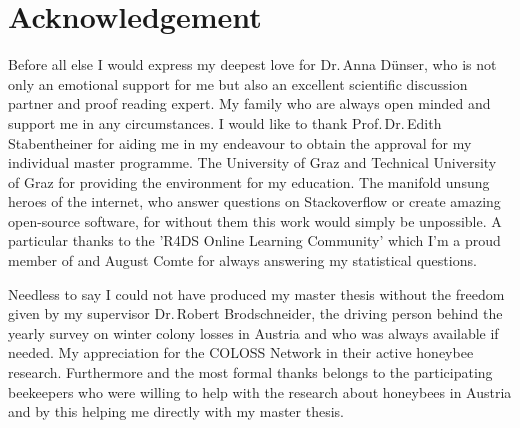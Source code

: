 \chapter*{Acknowledgement}
\label{sec:acknowledgement}
\vspace*{-10mm}

Before all else I would express my deepest love for Dr.\,Anna Dünser, who is not only an emotional support for me but also an excellent scientific discussion partner and proof reading expert. My family who are always open minded and support me in any circumstances. I would like to thank Prof.\,Dr.\,Edith Stabentheiner for aiding me in my endeavour to obtain the approval for my individual master programme. The University of Graz and Technical University of Graz for providing the environment for my education. The manifold unsung heroes of the internet, who answer questions on Stackoverflow or create amazing open-source software, for without them this work would simply be unpossible. A particular thanks to the 'R4DS Online Learning Community' which I'm a proud member of and August Comte for always answering my statistical questions.

Needless to say I could not have produced my master thesis without the freedom given by my supervisor Dr.\,Robert Brodschneider, the driving person behind the yearly survey on winter colony losses in Austria and who was always available if needed. My appreciation for the COLOSS Network in their active honeybee research. Furthermore and the most formal thanks belongs to the participating beekeepers who were willing to help with the research about honeybees in Austria and by this helping me directly with my master thesis.